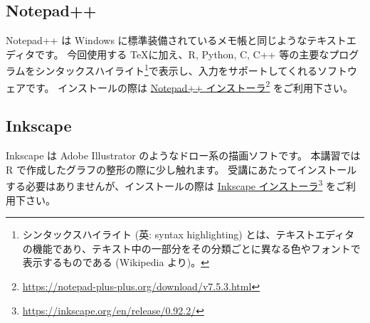 \documentclass[TeXworkshop]{subfiles}
\begin{document}
\subsection*{Notepad++}
Notepad++ は Windows に標準装備されているメモ帳と同じようなテキストエディタです。
今回使用する \TeX に加え、R, Python, C, C++ 等の主要なプログラムをシンタックスハイライト\footnote{シンタックスハイライト (英: syntax highlighting) とは、テキストエディタの機能であり、テキスト中の一部分をその分類ごとに異なる色やフォントで表示するものである (Wikipedia より)。}で表示し、入力をサポートしてくれるソフトウェアです。
インストールの際は \href{https://notepad-plus-plus.org/download/v7.5.3.html}{Notepad++ インストーラ}\footnote{\url{https://notepad-plus-plus.org/download/v7.5.3.html}} をご利用下さい。

\subsection*{Inkscape}
Inkscape は Adobe Illustrator のようなドロー系の描画ソフトです。
本講習では R で作成したグラフの整形の際に少し触れます。
受講にあたってインストールする必要はありませんが、インストールの際は \href{https://inkscape.org/en/release/0.92.2/}{Inkscape インストーラ}\footnote{\url{https://inkscape.org/en/release/0.92.2/}} をご利用下さい。
\end{document}
